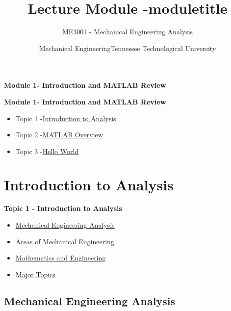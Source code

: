 \documentclass[fleqn]{ltx-talk} %
\author{ME3001 - Mechanical Engineering Analysis}
\title{Lecture Module -moduletitle}
\date{Mechanical Engineering\vspc Tennessee Technological University}
\newcommand{\MNUM}{1\hspace{2mm}} %
\newcommand{\moduletitle}{Introduction and MATLAB Review}
\newcommand{\sectionItitle}{Introduction to Analysis}
\newcommand{\sectionIItitle}{MATLAB Overview}
\newcommand{\sectionIIItitle}{Hello World}
\newcommand{\sectionIsubsectionItitle}{Mechanical Engineering Analysis}
\newcommand{\sectionIsubsectionIItitle}{Areas of Mechanical Engineering}
\newcommand{\sectionIsubsectionIIItitle}{Mathematics and Engineering}
\newcommand{\sectionIsubsectionIVtitle}{Major Topics}
\begin{document}
	\begin{frame}
		
		\begin{framed}\Large\textbf{Module \MNUM - \moduletitle}\end{framed}
	\end{frame}


	\begin{frame}
		
		\large\textbf{Module \MNUM - \moduletitle} \vspace{3mm}\\

		\begin{itemize}
			\item Topic 1 -\hyperlink{sectionI}{\sectionItitle} \vspc %
			\item Topic 2 -\hyperlink{sectionII}{\sectionIItitle} \vspc %
			\item Topic 3 -\hyperlink{sectionIII}{\sectionIIItitle} \vspc %
		\end{itemize}

	\end{frame}

	\section{\sectionItitle}\label{sectionI}

		\begin{frame} 
			\large\textbf{Topic 1 - \sectionItitle} \vspace{3mm}\\

			\begin{itemize}
				\item \hyperlink{sectionIsubsectionI}{\sectionIsubsectionItitle} \vspc %
				\item \hyperlink{sectionIsubsectionII}{\sectionIsubsectionIItitle} \vspc %
				\item \hyperlink{sectionIsubsectionIII}{\sectionIsubsectionIIItitle} \vspc %
				\item \hyperlink{sectionIsubsectionIV}{\sectionIsubsectionIVtitle} \vspc %
			\end{itemize}
		\end{frame}
		
	\subsection{\sectionIsubsectionItitle}\label{sectionIsubsectionI}
\end{document}
